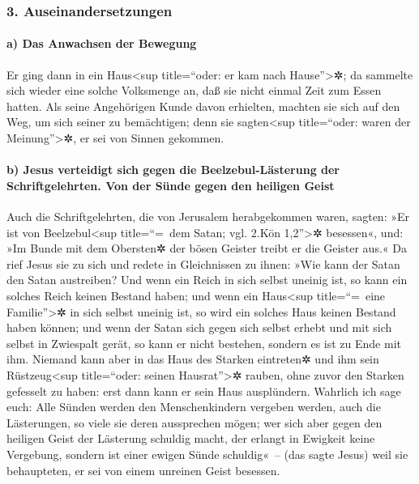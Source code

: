 \hypertarget{auseinandersetzungen}{%
\subsubsection{3. Auseinandersetzungen}\label{auseinandersetzungen}}

\hypertarget{a-das-anwachsen-der-bewegung}{%
\paragraph{a) Das Anwachsen der
Bewegung}\label{a-das-anwachsen-der-bewegung}}

 Er ging dann in ein Haus\textless sup title=``oder: er
kam nach Hause''\textgreater✲; da sammelte sich wieder eine solche
Volksmenge an, daß sie nicht einmal Zeit zum Essen hatten.
 Als seine Angehörigen Kunde davon erhielten, machten sie
sich auf den Weg, um sich seiner zu bemächtigen; denn sie
sagten\textless sup title=``oder: waren der Meinung''\textgreater✲, er
sei von Sinnen gekommen.

\hypertarget{b-jesus-verteidigt-sich-gegen-die-beelzebul-luxe4sterung-der-schriftgelehrten.-von-der-suxfcnde-gegen-den-heiligen-geist}{%
\paragraph{b) Jesus verteidigt sich gegen die Beelzebul-Lästerung der
Schriftgelehrten. Von der Sünde gegen den heiligen
Geist}\label{b-jesus-verteidigt-sich-gegen-die-beelzebul-luxe4sterung-der-schriftgelehrten.-von-der-suxfcnde-gegen-den-heiligen-geist}}

 Auch die Schriftgelehrten, die von Jerusalem
herabgekommen waren, sagten: »Er ist von Beelzebul\textless sup
title=``=~dem Satan; vgl. 2.Kön 1,2''\textgreater✲ besessen«, und: »Im
Bunde mit dem Obersten✲ der bösen Geister treibt er die Geister aus.«
 Da rief Jesus sie zu sich und redete in Gleichnissen zu
ihnen: »Wie kann der Satan den Satan austreiben?  Und
wenn ein Reich in sich selbst uneinig ist, so kann ein solches Reich
keinen Bestand haben;  und wenn ein Haus\textless sup
title=``=~eine Familie''\textgreater✲ in sich selbst uneinig ist, so
wird ein solches Haus keinen Bestand haben können;  und
wenn der Satan sich gegen sich selbst erhebt und mit sich selbst in
Zwiespalt gerät, so kann er nicht bestehen, sondern es ist zu Ende mit
ihm.  Niemand kann aber in das Haus des Starken
eintreten✲ und ihm sein Rüstzeug\textless sup title=``oder: seinen
Hausrat''\textgreater✲ rauben, ohne zuvor den Starken gefesselt zu
haben: erst dann kann er sein Haus ausplündern.  Wahrlich
ich sage euch: Alle Sünden werden den Menschenkindern vergeben werden,
auch die Lästerungen, so viele sie deren aussprechen mögen;
 wer sich aber gegen den heiligen Geist der Lästerung
schuldig macht, der erlangt in Ewigkeit keine Vergebung, sondern ist
einer ewigen Sünde schuldig«~--  (das sagte Jesus) weil
sie behaupteten, er sei von einem unreinen Geist besessen.

